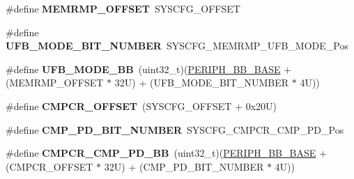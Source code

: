 \begin{DoxyCompactItemize}
\item 
\mbox{\label{group___h_a_l___private___constants_ga7f801653c361f31380f21357f92dc9af}} 
\#define {\bfseries M\+E\+M\+R\+M\+P\+\_\+\+O\+F\+F\+S\+ET}~S\+Y\+S\+C\+F\+G\+\_\+\+O\+F\+F\+S\+ET
\item 
\mbox{\label{group___h_a_l___private___constants_gac8a0079a8d30ec8633adaed9e2cfa49d}} 
\#define {\bfseries U\+F\+B\+\_\+\+M\+O\+D\+E\+\_\+\+B\+I\+T\+\_\+\+N\+U\+M\+B\+ER}~S\+Y\+S\+C\+F\+G\+\_\+\+M\+E\+M\+R\+M\+P\+\_\+\+U\+F\+B\+\_\+\+M\+O\+D\+E\+\_\+\+Pos
\item 
\mbox{\label{group___h_a_l___private___constants_ga96bde9109ea6ea0a7887658669ff9221}} 
\#define {\bfseries U\+F\+B\+\_\+\+M\+O\+D\+E\+\_\+\+BB}~(uint32\+\_\+t)(\hyperlink{group___peripheral__memory__map_gaed7efc100877000845c236ccdc9e144a}{P\+E\+R\+I\+P\+H\+\_\+\+B\+B\+\_\+\+B\+A\+SE} + (M\+E\+M\+R\+M\+P\+\_\+\+O\+F\+F\+S\+ET $\ast$ 32\+U) + (\+U\+F\+B\+\_\+\+M\+O\+D\+E\+\_\+\+B\+I\+T\+\_\+\+N\+U\+M\+B\+E\+R $\ast$ 4\+U))
\item 
\mbox{\label{group___h_a_l___private___constants_ga8e5fbe846e7478d522df749672b90084}} 
\#define {\bfseries C\+M\+P\+C\+R\+\_\+\+O\+F\+F\+S\+ET}~(S\+Y\+S\+C\+F\+G\+\_\+\+O\+F\+F\+S\+ET + 0x20\+U)
\item 
\mbox{\label{group___h_a_l___private___constants_ga9e34adb28e3eed088c55766f72d53183}} 
\#define {\bfseries C\+M\+P\+\_\+\+P\+D\+\_\+\+B\+I\+T\+\_\+\+N\+U\+M\+B\+ER}~S\+Y\+S\+C\+F\+G\+\_\+\+C\+M\+P\+C\+R\+\_\+\+C\+M\+P\+\_\+\+P\+D\+\_\+\+Pos
\item 
\mbox{\label{group___h_a_l___private___constants_gae4516ed27e02d84d9d20c7d711b87437}} 
\#define {\bfseries C\+M\+P\+C\+R\+\_\+\+C\+M\+P\+\_\+\+P\+D\+\_\+\+BB}~(uint32\+\_\+t)(\hyperlink{group___peripheral__memory__map_gaed7efc100877000845c236ccdc9e144a}{P\+E\+R\+I\+P\+H\+\_\+\+B\+B\+\_\+\+B\+A\+SE} + (C\+M\+P\+C\+R\+\_\+\+O\+F\+F\+S\+ET $\ast$ 32\+U) + (\+C\+M\+P\+\_\+\+P\+D\+\_\+\+B\+I\+T\+\_\+\+N\+U\+M\+B\+E\+R $\ast$ 4\+U))
\item 
\mbox{\label{group___h_a_l___private___constants_ga41f6d93357082d3177da0e85b872b6cf}} 

\end{DoxyCompactItemize}
